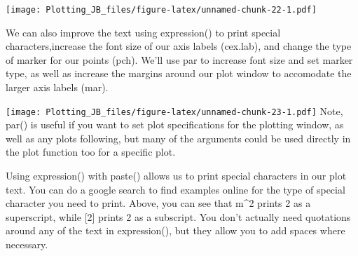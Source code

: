 \documentclass[]{article}
\newenvironment{Shaded}{\begin{snugshade}}{\end{snugshade}}
\newcommand{\DataTypeTok}[1]{\textcolor[rgb]{0.13,0.29,0.53}{#1}}
\newcommand{\DecValTok}[1]{\textcolor[rgb]{0.00,0.00,0.81}{#1}}
\newcommand{\FloatTok}[1]{\textcolor[rgb]{0.00,0.00,0.81}{#1}}
\newcommand{\KeywordTok}[1]{\textcolor[rgb]{0.13,0.29,0.53}{\textbf{#1}}}
\newcommand{\NormalTok}[1]{#1}
\newcommand{\OperatorTok}[1]{\textcolor[rgb]{0.81,0.36,0.00}{\textbf{#1}}}
\newcommand{\StringTok}[1]{\textcolor[rgb]{0.31,0.60,0.02}{#1}}
\begin{document}
\texttt{[image: Plotting\_JB\_files/figure-latex/unnamed-chunk-22-1.pdf]}

We can also improve the text using expression() to print special
characters,increase the font size of our axis labels (cex.lab), and
change the type of marker for our points (pch). We'll use par to
increase font size and set marker type, as well as increase the margins
around our plot window to accomodate the larger axis labels (mar).

\begin{Shaded}
\end{Shaded}

\texttt{[image: Plotting\_JB\_files/figure-latex/unnamed-chunk-23-1.pdf]}
Note, par() is useful if you want to set plot specifications for the
plotting window, as well as any plots following, but many of the
arguments could be used directly in the plot function too for a specific
plot.

Using expression() with paste() allows us to print special characters in
our plot text. You can do a google search to find examples online for
the type of special character you need to print. Above, you can see that
m\^{}2 prints 2 as a superscript, while {[}2{]} prints 2 as a subscript.
You don't actually need quotations around any of the text in
expression(), but they allow you to add spaces where necessary.
\end{document}
